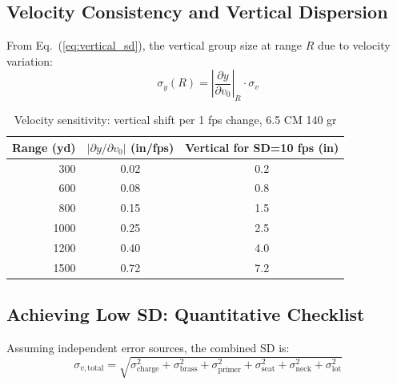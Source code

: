 \documentclass[11pt,twoside,openright]{report}
\begin{document}
\subsection{Velocity Consistency and Vertical Dispersion}

From Eq.~(\ref{eq:vertical_sd}), the vertical group size at range $R$ due to velocity variation:
\begin{equation}
  \sigma_y(R) = \left|\frac{\partial y}{\partial v_0}\right|_R \cdot \sigma_v
  \label{eq:vert_disp_sv}
\end{equation}

\begin{table}[H]
\centering
\caption{Velocity sensitivity: vertical shift per 1 fps change, 6.5 CM 140 gr}
\label{tab:vel_sensitivity}
\begin{tabular}{@{}rcc@{}}
\toprule
\textbf{Range (yd)} & $|\partial y/\partial v_0|$ \textbf{(in/fps)} & \textbf{Vertical for SD=10 fps (in)} \\
\midrule
300  & 0.02 & 0.2 \\
600  & 0.08 & 0.8 \\
800  & 0.15 & 1.5 \\
1000 & 0.25 & 2.5 \\
1200 & 0.40 & 4.0 \\
1500 & 0.72 & 7.2 \\
\bottomrule
\end{tabular}
\end{table}

\subsection{Achieving Low SD: Quantitative Checklist}

Assuming independent error sources, the combined SD is:
\begin{equation}
  \sigma_{v,\text{total}} = \sqrt{\sigma_{\text{charge}}^2 + \sigma_{\text{brass}}^2 + \sigma_{\text{primer}}^2 + \sigma_{\text{seat}}^2 + \sigma_{\text{neck}}^2 + \sigma_{\text{lot}}^2}
  \label{eq:sd_budget}
\end{equation}
\end{document}
